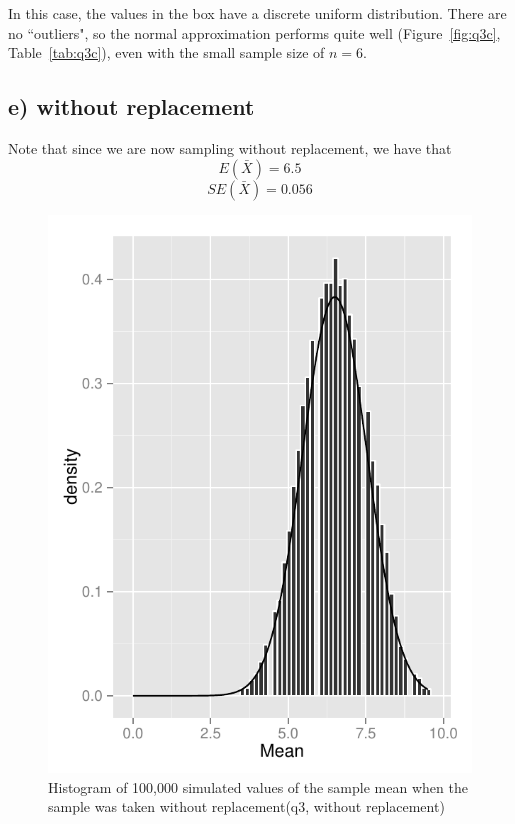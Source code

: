 \documentclass[11pt]{article}
\begin{document}
\noindent In this case, the values in the box have a discrete uniform distribution.  There are no ``outliers", so the normal approximation performs quite well (Figure~\ref{fig:q3c}, Table~\ref{tab:q3c}), even with the small sample size of $n=6$.



\subsection*{e) without replacement}


\noindent Note that since we are now sampling without replacement, we have that
$$E(\bar{X})= 6.5$$ 
$$SE(\bar{X}) = 0.056$$


\begin{figure}
\centering
\includegraphics[scale=1]{histogram_3e-1.pdf}
\caption{Histogram of 100,000 simulated values of the sample mean when the sample was taken without replacement(q3, without replacement)}
\end{figure}
\end{document}
